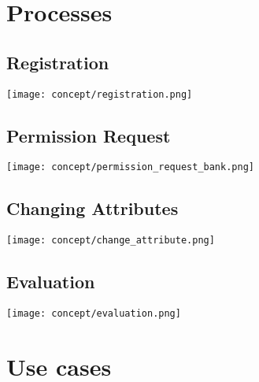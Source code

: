 \section{Processes}

\subsection{Registration}

 \texttt{[image: concept/registration.png]}

\subsection{Permission Request}

 \texttt{[image: concept/permission\_request\_bank.png]}

\subsection{Changing Attributes}

 \texttt{[image: concept/change\_attribute.png]}

\subsection{Evaluation}

 \texttt{[image: concept/evaluation.png]}
 
\section{Use cases}

